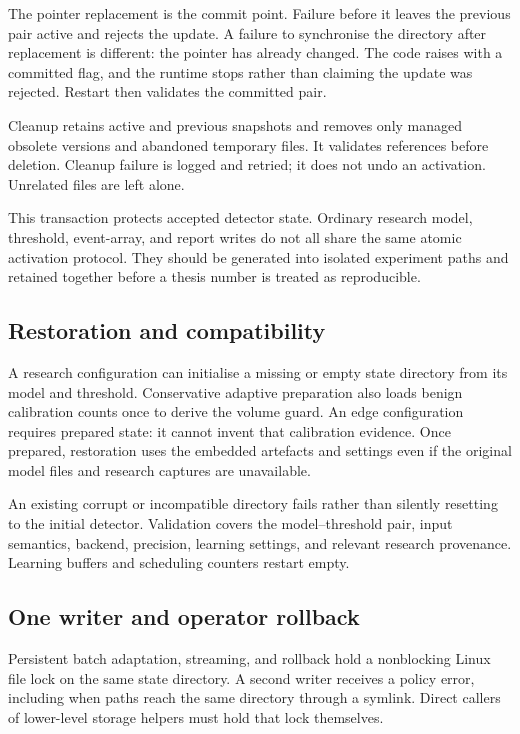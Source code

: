 The pointer replacement is the commit point. Failure before it leaves the
previous pair active and rejects the update. A failure to synchronise the
directory after replacement is different: the pointer has already changed.
The code raises  with a committed flag, and the
runtime stops rather than claiming the update was rejected.
Restart then validates the committed pair.

Cleanup retains active and previous snapshots and removes only managed obsolete
versions and abandoned temporary files. It validates references before deletion.
Cleanup failure is logged and retried; it does not undo an activation.
Unrelated files are left alone.

This transaction protects accepted detector state. Ordinary research model,
threshold, event-array, and report writes do not all share the same atomic
activation protocol. They should be generated into isolated experiment paths
and retained together before a thesis number is treated as reproducible.

\subsection{Restoration and compatibility}

A research configuration can initialise a missing or empty state directory from
its model and threshold. Conservative adaptive preparation also loads benign
calibration counts once to derive the volume guard. An edge configuration
requires prepared state: it cannot invent that calibration evidence.
Once prepared, restoration uses the embedded artefacts and settings even if the
original model files and research captures are unavailable.

An existing corrupt or incompatible directory fails rather than silently
resetting to the initial detector. Validation covers the model--threshold pair,
input semantics, backend, precision, learning settings, and relevant research
provenance. Learning buffers and scheduling counters restart empty.

\subsection{One writer and operator rollback}

Persistent batch adaptation, streaming, and rollback hold a nonblocking Linux
file lock on the same state directory. A second writer receives a policy error,
including when paths reach the same directory through a symlink. Direct callers
of lower-level storage helpers must hold that lock themselves.

